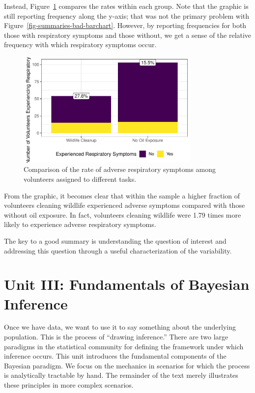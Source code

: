 \documentclass[
  letterpaper,
  DIV=11,
  numbers=noendperiod]{scrreprt}
\theoremstyle{definition}
\theoremstyle{definition}
\theoremstyle{plain}
\theoremstyle{remark}
\begin{document}
Instead, Figure~\ref{fig-summaries-good-barchart} compares the rates
within each group. Note that the graphic is still reporting frequency
along the y-axis; that was not the primary problem with
Figure~\ref{fig-summaries-bad-barchart}. However, by reporting
frequencies for both those with respiratory symptoms and those without,
we get a sense of the relative frequency with which respiratory symptoms
occur.

\begin{figure}

{\centering \includegraphics[width=0.8\textwidth,height=\textheight]{./images/fig-summaries-good-barchart-1.pdf}

}

\caption{\label{fig-summaries-good-barchart}Comparison of the rate of
adverse respiratory symptoms among volunteers assigned to different
tasks.}

\end{figure}

From the graphic, it becomes clear that within the sample a higher
fraction of volunteers cleaning wildlife experienced adverse symptoms
compared with those without oil exposure. In fact, volunteers cleaning
wildlife were 1.79 times more likely to experience adverse respiratory
symptoms.

The key to a good summary is understanding the question of interest and
addressing this question through a useful characterization of the
variability.

\part{Unit III: Fundamentals of Bayesian Inference}

Once we have data, we want to use it to say something about the
underlying population. This is the process of ``drawing inference.''
There are two large paradigms in the statistical community for defining
the framework under which inference occurs. This unit introduces the
fundamental components of the Bayesian paradigm. We focus on the
mechanics in scenarios for which the process is analytically tractable
by hand. The remainder of the text merely illustrates these principles
in more complex scenarios.
\end{document}
